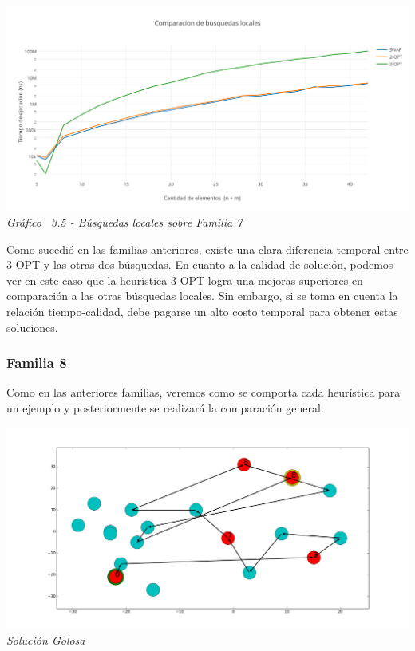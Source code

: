\vspace*{0.3cm} \vspace*{0.3cm}
  \begin{center}
 \includegraphics[scale=0.5]{./EJ3/comparacionbusquedaslocalesanillos.png}\\
 {            \textit{Gráfico \ 3.5 - Búsquedas locales sobre Familia 7}}
  \end{center}
  \vspace*{0.3cm}
  
Como sucedió en las familias anteriores, existe una clara diferencia temporal entre 3-OPT y las otras dos búsquedas. En cuanto a la calidad de soluci\'on, podemos ver en este caso que la heur\'istica 3-OPT logra una mejoras superiores en comparación a las otras búsquedas locales. Sin embargo, si se toma en cuenta la relaci\'on tiempo-calidad, debe pagarse un alto costo temporal para obtener estas soluciones.\\
  
\subsubsection*{Familia 8}

Como en las anteriores familias, veremos como se comporta cada heur\'istica para un ejemplo y posteriormente se realizará la comparaci\'on general.

\vspace*{0.3cm} \vspace*{0.3cm}
  \begin{center}
 \includegraphics[scale=0.3]{./EJ3/randomgoloso.png}\\
 {            \textit{Soluci\'on Golosa}}
  \end{center}
  \vspace*{0.3cm}

